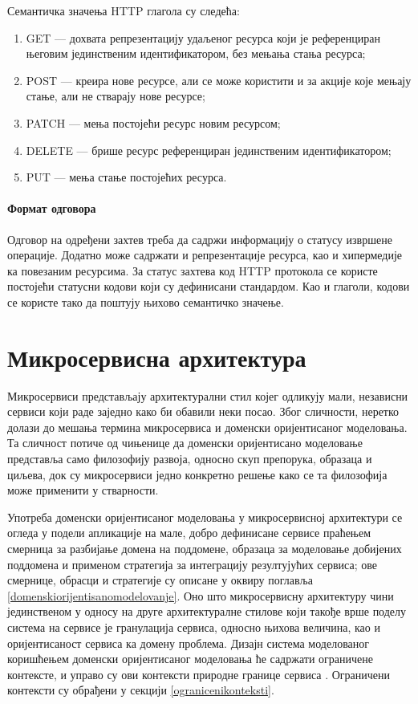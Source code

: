 \documentclass[12pt,oneside]{memoir}
\begin{document}
Семантичка значења HTTP глагола су следећа:
\begin{enumerate}
\item GET --- дохвата репрезентацију удаљеног ресурса који је референциран његовим јединственим идентификатором, без мењања стања ресурса;
\item POST --- креира нове ресурсе, али се може користити и за акције које мењају стање, али не стварају нове ресурсе;
\item PATCH --- мења постојећи ресурс новим ресурсом;
\item DELETE --- брише ресурс референциран јединственим идентификатором;
\item PUT --- мења стање постојећих ресурса.
\end{enumerate}

\subsubsection{Формат одговора}
Одговор на одређени захтев треба да садржи информацију о статусу извршене операције. Додатно може садржати и репрезентације ресурса, као и хипермедије ка повезаним ресурсима. За статус захтева код HTTP протокола се користе постојећи статусни кодови који су дефинисани стандардом. Као и глаголи, кодови се користе тако да поштују њихово семантичко значење.

\chapter{Микросервисна архитектура}\label{mikroservisi}
Микросервиси представљају архитектурални стил којег одликују мали, независни сервиси који раде заједно како би обавили неки посао. Због сличности, неретко долази до мешања термина микросервиса и доменски оријентисаног моделовања. Та сличност потиче од чињенице да доменски оријентисано моделовање представља само филозофију развоја, односно скуп препорука, образаца и циљева, док су микросервиси једно конкретно решење како се та филозофија може применити у стварности.

Употреба доменски оријентисаног моделовања у микросервисној архитектури се огледа у подели апликације на мале, добро дефинисане сервисе праћењем смерница за разбијање домена на поддомене, образаца за моделовање добијених поддомена и применом стратегија за интеграцију резултујућих сервиса; ове смернице, обрасци и стратегије су описане у оквиру поглавља \ref{domenskiorijentisanomodelovanje}. Оно што микросервисну архитектуру чини јединственом у односу на друге архитектуралне стилове који такође врше поделу система на сервисе је гранулација сервиса, односно њихова величина, као и оријентисаност сервиса ка домену проблема. Дизајн система моделованог коришћењем доменски оријентисаног моделовања ће садржати ограничене контексте, и управо су ови контексти природне границе сервиса \cite{netmicroservices}. Ограничени контексти су обрађени у секцији \ref{ogranicenikonteksti}.
\end{document}
